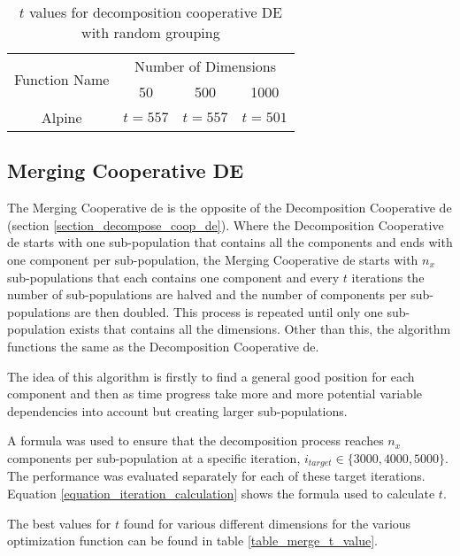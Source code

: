 \documentclass[hidelinks,english,conference]{IEEEtran}
\begin{document}
		\begin{table}
			\centering
			\begin{tabular}{ | c | c | c | c | }
				\hline
				\multirow{2}{*}{Function Name} & \multicolumn{3}{|c|}{Number of Dimensions} \\\cline{2-4}
				 & 50 & 500 & 1000\\
				\hline
				Alpine & $t=557$ & $t=557$ & $t=501$ \\
				\hline
			\end{tabular}
			\caption{$t$ values for decomposition cooperative DE with random grouping}
			\label{table_decomposition_random_t_value}
		\end{table}

	\subsection{Merging Cooperative DE}\label{section_merge_coop_de} %
		The Merging Cooperative \gls{de} is the opposite of the Decomposition Cooperative \gls{de} (section \ref{section_decompose_coop_de}). Where the Decomposition Cooperative \gls{de} starts with one sub-population that contains all the components and ends with one component per sub-population, the Merging Cooperative \gls{de} starts with $n_x$ sub-populations that each contains one component and every $t$ iterations the number of sub-populations are halved and the number of components per sub-populations are then doubled. This process is repeated until only one sub-population exists that contains all the dimensions. Other than this, the algorithm functions the same as the Decomposition Cooperative \gls{de}.

		The idea of this algorithm is firstly to find a general good position for each component and then as time progress take more and more potential variable dependencies into account but creating larger sub-populations.
        
        A formula was used to ensure that the decomposition process reaches $n_x$ components per sub-population at a specific iteration, $i_{target} \in \lbrace 3000, 4000, 5000 \rbrace$. The performance was evaluated separately for each of these target iterations. Equation \ref{equation_iteration_calculation} shows the formula used to calculate $t$.

		The best values for $t$ found for various different dimensions for the various optimization function can be found in table \ref{table_merge_t_value}. 
\end{document}
